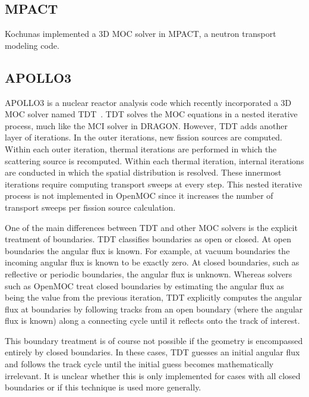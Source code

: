 \subsection{MPACT}
\label{sec:mpact}

Kochunas implemented a 3D \ac{MOC} solver in MPACT, a neutron transport modeling code.  

\subsection{APOLLO3}
\label{sec:apollo3}

APOLLO3 is a nuclear reactor analysis code which recently incorporated a 3D \ac{MOC} solver named TDT~\cite{Sciannandrone2016}. TDT solves the \ac{MOC} equations in a nested iterative process, much like the MCI solver in DRAGON. However, TDT adds another layer of iterations. In the outer iterations, new fission sources are computed. Within each outer iteration, thermal iterations are performed in which the scattering source is recomputed. Within each thermal iteration, internal iterations are conducted in which the spatial distribution is resolved. These innermost iterations require computing transport sweeps at every step. This nested iterative process is not implemented in OpenMOC since it increases the number of transport sweeps per fission source calculation. 

One of the main differences between TDT and other \ac{MOC} solvers is the explicit treatment of boundaries. TDT classifies boundaries as open or closed. At open boundaries the angular flux is known. For example, at vacuum boundaries the incoming angular flux is known to be exactly zero. At closed boundaries, such as reflective or periodic boundaries, the angular flux is unknown. Whereas solvers such as OpenMOC treat closed boundaries by estimating the angular flux as being the value from the previous iteration, TDT explicitly computes the angular flux at boundaries by following tracks from an open boundary (where the angular flux is known) along a connecting cycle until it reflects onto the track of interest.

This boundary treatment is of course not possible if the geometry is encompassed entirely by closed boundaries. In these cases, TDT guesses an initial angular flux and follows the track cycle until the initial guess becomes mathematically irrelevant. It is unclear whether this is only implemented for cases with all closed boundaries or if this technique is used more generally.

